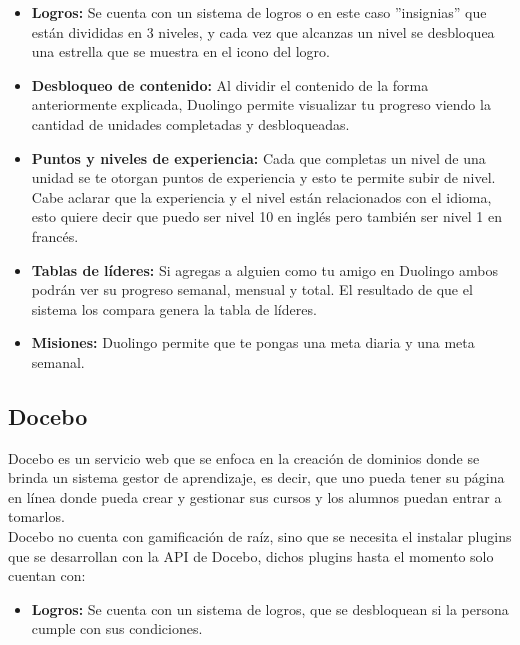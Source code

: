 \begin{multicols}{2}
    \begin{itemize}
        \item \textbf{Logros: }Se cuenta con un sistema de logros o en este caso ''insignias'' que están divididas en 3 niveles, y cada vez que alcanzas un nivel se desbloquea una estrella que se muestra en el icono del logro.
        \item \textbf{Desbloqueo de contenido: } Al dividir el contenido de la forma anteriormente explicada, Duolingo permite visualizar tu progreso viendo la cantidad de unidades completadas y desbloqueadas.
        \item \textbf{Puntos y niveles de experiencia: } Cada que completas un nivel de una unidad se te otorgan puntos de experiencia y esto te permite subir de nivel. Cabe aclarar que la experiencia y el nivel están relacionados con el idioma, esto quiere decir que puedo ser nivel 10 en inglés pero también ser nivel 1 en francés.
        \item \textbf{Tablas de líderes: } Si agregas a alguien como tu amigo en Duolingo ambos podrán ver su progreso semanal, mensual y total. El resultado de que el sistema los compara genera la tabla de líderes. 
        \item \textbf{Misiones: } Duolingo permite que te pongas una meta diaria y una meta semanal.
    \end{itemize}


 \subsection*{Docebo}
    
    Docebo es un servicio web que se enfoca en la creación de dominios donde se brinda un sistema gestor de aprendizaje, es decir, que uno pueda tener su página en línea donde pueda crear y gestionar sus cursos y los alumnos puedan entrar a tomarlos.\\
    
    \noindent Docebo no cuenta con gamificación de raíz, sino que se necesita el instalar plugins que se desarrollan con la API de Docebo, dichos plugins hasta el momento solo cuentan con:\\
    \begin{itemize}
        \item \textbf{Logros: } Se cuenta con un sistema de logros, que se desbloquean si la persona cumple con sus condiciones.
    \end{itemize}
    
    
\begin{comment}

\end{comment}
\end{multicols}
